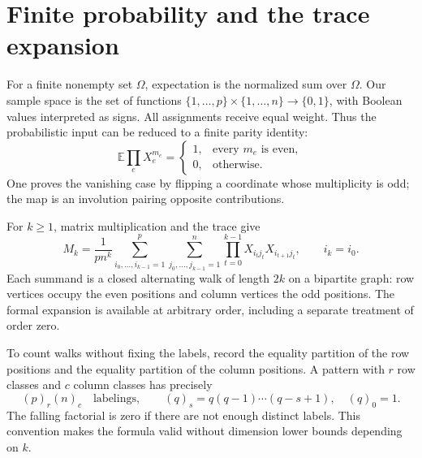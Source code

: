 \documentclass[11pt]{article}
\theoremstyle{remark}
\newcommand{\E}{\mathbb E}
\newcommand{\fall}[2]{(#1)_{#2}}
\begin{document}
\section{Finite probability and the trace expansion}
For a finite nonempty set $\Omega$, expectation is the normalized sum over $\Omega$. Our sample space is the set of functions $\{1,\ldots,p\}\times\{1,\ldots,n\}\to\{0,1\}$, with Boolean values interpreted as signs. All assignments receive equal weight. Thus the probabilistic input can be reduced to a finite parity identity:
\begin{equation}\label{eq:parity}
 \E\prod_{e}X_e^{m_e}=
 \begin{cases}1,&\text{every }m_e\text{ is even},\\0,&\text{otherwise}.
 \end{cases}
\end{equation}
One proves the vanishing case by flipping a coordinate whose multiplicity is odd; the map is an involution pairing opposite contributions.

For $k\geq1$, matrix multiplication and the trace give
\begin{equation}\label{eq:walk}
 M_k=\frac1{pn^k}
 \sum_{i_0,\ldots,i_{k-1}=1}^{p}
 \sum_{j_0,\ldots,j_{k-1}=1}^{n}
 \prod_{t=0}^{k-1}X_{i_tj_t}X_{i_{t+1}j_t},\qquad i_k=i_0.
\end{equation}
Each summand is a closed alternating walk of length $2k$ on a bipartite graph: row vertices occupy the even positions and column vertices the odd positions. The formal expansion is available at arbitrary order, including a separate treatment of order zero.

To count walks without fixing the labels, record the equality partition of the row positions and the equality partition of the column positions. A pattern with $r$ row classes and $c$ column classes has precisely
\[
 \fall{p}{r}\fall{n}{c}
 \quad\text{labelings},\qquad
 \fall{q}{s}=q(q-1)\cdots(q-s+1),\quad\fall{q}{0}=1.
\]
The falling factorial is zero if there are not enough distinct labels. This convention makes the formula valid without dimension lower bounds depending on $k$.
\end{document}
